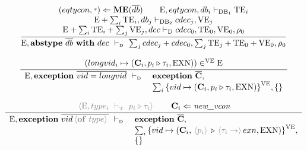 \documentclass[11pt,a4paper]{article}
\newcommand{\key}[1]{\textrm{\textbf{#1}}}
\newcommand{\qualtype}[2]{#1 \triangleright #2}
\newcommand{\braced}[1]{\{#1\}}
\newcommand{\angled}[1]{\,{\color{gray}\langle#1\rangle}\,}
\newcommand{\wildcard}{{\color{gray}\scriptstyle\textbf{*}}}
\newcommand{\Env}  {\textrm{E}}
\newcommand{\VE}   {\textrm{VE}}
\newcommand{\TE}   {\textrm{TE}}
\newcommand{\Dec}  {\textrm{D}}
\newcommand{\DB}   {\textrm{DB}}
\newcommand{\VKE}  {\textrm{EXN}}
\newcommand{\vcon} {\mathbf{C}}
\newcommand{\Empty}{\braced{}}
\newcommand{\vdashD}  {\ \vdash_{\textrm{\tiny D}}\  }
\newcommand{\vdashT}  {\ \vdash_{\textrm{\tiny T}}\  }
\newcommand{\MaximizeEq}{\key{ME}}
\newcommand{\corenew}[1]{\textit{new\_#1}}
\begin{document}
\[
\cfrac
 {\begin{array}{c}
  (eqtycon,\wildcard)\Leftarrow \MaximizeEq(\overline{db})						 \qquad
   \Env,eqtycon,db_{i} \vdash_{\DB_1} \TE_i 									 \\ 
   \Env+\sum_i{\TE_i},db_j \vdash_{\DB_2} cdec_j,\VE_j       					 \\
  \Env+\sum_i{\TE_i}+\sum_j{\VE_j}, dec \vdash_{\Dec} cdec_0, \TE_0,\VE_0,\rho_0 \\
  \end{array}}
 {\Env, \key{abstype}\ \overline{db}\ \key{with}\ dec \vdashD \sum_{j}cdec_j+cdec_0, \sum_{j}\TE_j+\TE_0+\VE_0, \rho_0}
\]

\[
\cfrac
 {(longvid_i \mapsto (\vcon_i, \qualtype{p_i}{\tau_i}, \VKE)) \in^\VE \Env }
 {\begin{array}{ll}
  \Env, \key{exception}\ \overline{vid = longvid} \vdashD & \key{exception}\ \overline{\vcon}, \\
  & \sum_i{\braced{vid \mapsto (\vcon_i, \qualtype{p_i}{\tau_i}, \VKE)}}^\VE , \Empty \\
  \end{array}}
\]

\[
\cfrac
 {\angled{\Env,type_i \vdashT \qualtype{p_i}{\tau_i}} \qquad \vcon_i\Leftarrow\corenew{vcon}}
 {\begin{array}{ll}
  \Env, \key{exception}\ \overline{vid \angled{\key{of}\ type}} \vdashD & \key{exception}\ \overline{\vcon}, \\
  & \sum_i{\braced{vid \mapsto (\vcon_i, \qualtype{\angled{p_i}}{\angled{\tau_i \to} exn, \VKE)}}}^\VE , \\
  & \Empty \\
  \end{array}}
\]
\end{document}
